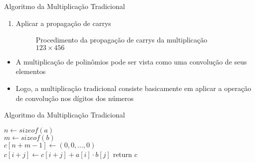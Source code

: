 \documentclass{beamer}
\newcounter{saveenumi}
\newcommand{\seti}{\setcounter{saveenumi}{\value{enumi}}}
\newcommand{\conti}{\setcounter{enumi}{\value{saveenumi}}}
\begin{document}
\begin{frame}{Algoritmo da Multiplicação Tradicional}
	\begin{enumerate}
		\conti
		\item Aplicar a propagação de carrys

		\begin{figure}[H]
			\center
			\caption{Procedimento da propagação de carrys da multiplicação $123\times456$}
			\label{fig:propagacaocarrys}
		\end{figure}
		\seti
	\end{enumerate}

	\begin{itemize}
		\item A multiplicação de polinômios pode ser vista como uma convolução de seus elementos
		\item Logo, a multiplicação tradicional consiste basicamente em aplicar a operação de convolução nos dígitos dos números
	\end{itemize}
\end{frame}

\begin{frame}{Algoritmo da Multiplicação Tradicional}

	\begin{algorithm}[H]

	    \BlankLine

	    {
	    	$n \leftarrow sizeof(a)$\\
	    	$m \leftarrow sizeof(b)$\\
	    	$c[n + m - 1] \leftarrow (0, 0, ..., 0)$\\
		    {
		    	{
		    		$c[i + j] \leftarrow c[i + j] + a[i] \cdot b[j]$
		    	}
		    }
		    return c
		}

	    \caption{Algoritmo de convolução de 2 vetores pela definição}
	    \label{alg:conv}
	\end{algorithm}
\end{frame}
\end{document}
